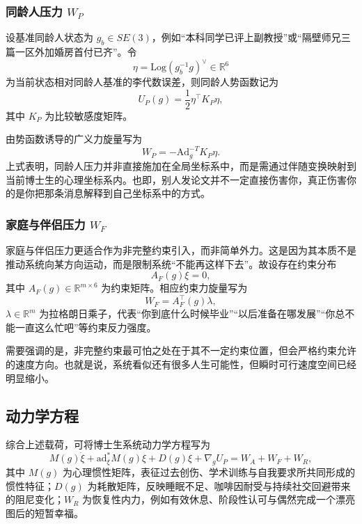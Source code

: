 \documentclass[UTF8,twocolumn,a4paper]{ctexart}
\begin{document}
\subsubsection{同龄人压力 $W_P$}

设基准同龄人状态为 $g_b\in SE(3)$，例如“本科同学已评上副教授”或“隔壁师兄三篇一区外加婚房首付已齐”。令
\begin{equation}
\eta=\mathrm{Log}\left(g_b^{-1}g\right)^\vee\in\mathbb{R}^6
\end{equation}
为当前状态相对同龄人基准的李代数误差，则同龄人势函数记为
\begin{equation}
U_P(g)=\frac{1}{2}\eta^\top K_P \eta,
\end{equation}
其中 $K_P$ 为比较敏感度矩阵。

由势函数诱导的广义力旋量写为
\begin{equation}
W_P=-\mathrm{Ad}_g^{-T}K_P\eta.
\end{equation}
上式表明，同龄人压力并非直接施加在全局坐标系中，而是需通过伴随变换映射到当前博士生的心理坐标系内。也即，别人发论文并不一定直接伤害你，真正伤害你的是你把那条消息解释到自己坐标系中的方式。

\subsubsection{家庭与伴侣压力 $W_F$}

家庭与伴侣压力更适合作为非完整约束引入，而非简单外力。这是因为其本质不是推动系统向某方向运动，而是限制系统“不能再这样下去”。故设存在约束分布
\begin{equation}
A_F(g)\xi=0,
\end{equation}
其中 $A_F(g)\in\mathbb{R}^{m\times 6}$ 为约束矩阵。相应约束力旋量写为
\begin{equation}
W_F=A_F^\top(g)\lambda,
\end{equation}
$\lambda\in\mathbb{R}^m$ 为拉格朗日乘子，代表“你到底什么时候毕业”“以后准备在哪发展”“你总不能一直这么忙吧”等约束反力强度。

需要强调的是，非完整约束最可怕之处在于其不一定约束位置，但会严格约束允许的速度方向。也就是说，系统看似还有很多人生可能性，但瞬时可行速度空间已经明显缩小。

\subsection{动力学方程}

综合上述载荷，可将博士生系统动力学方程写为
\begin{equation}
M(g)\dot{\xi}+\mathrm{ad}_{\xi}^*M(g)\xi + D(g)\xi + \nabla_g U_P
= W_A + W_F + W_R,
\label{eq:dynamics}
\end{equation}
其中 $M(g)$ 为心理惯性矩阵，表征过去创伤、学术训练与自我要求所共同形成的惯性特征；$D(g)$ 为耗散矩阵，反映睡眠不足、咖啡因耐受与持续社交回避带来的阻尼变化；$W_R$ 为恢复性内力，例如有效休息、阶段性认可与偶然完成一个漂亮图后的短暂幸福。
\end{document}
